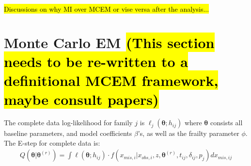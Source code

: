 \documentclass[preprint,12pt]{elsarticle}
\begin{document}
\hl{Discussions on why MI over MCEM or vise versa after the analysis...}

\section{Monte Carlo EM \hl{(This section needs to be re-written to a definitional MCEM framework, maybe consult papers)}}
The complete data log-likelihood for family $j$ is $\ell_j(\boldsymbol{\theta}; h_{ij})$
where $\boldsymbol{\theta}$ consists all baseline parameters, and model coefficients $\beta$'s, as well as the frailty parameter $\phi$. The E-step for complete data is:
\begin{align} 
    Q(\boldsymbol{\theta}|\boldsymbol{\theta}^{(r)})=\int \ell(\boldsymbol{\theta};h_{ij})\cdot f(x_{mis,i}|x_{obs,i},z, \boldsymbol{\theta}^{(r)}, t_{ij}, \delta_{ij}, p_j)dx_{mis,ij}
\end{align}
\end{document}

